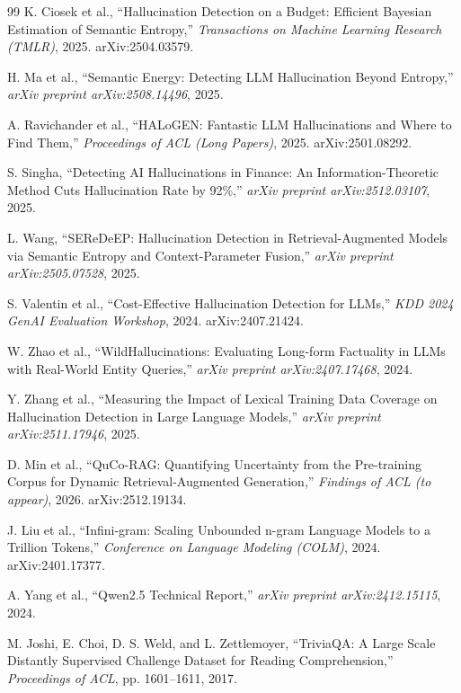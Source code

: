 \documentclass[oneside,ko,under]{snuthesis}
\begin{document}
\begin{thebibliography}{99}
K. Ciosek et al.,
``Hallucination Detection on a Budget: Efficient Bayesian Estimation of Semantic Entropy,''
\textit{Transactions on Machine Learning Research (TMLR)}, 2025. arXiv:2504.03579.

H. Ma et al.,
``Semantic Energy: Detecting LLM Hallucination Beyond Entropy,''
\textit{arXiv preprint arXiv:2508.14496}, 2025.

A. Ravichander et al.,
``HALoGEN: Fantastic LLM Hallucinations and Where to Find Them,''
\textit{Proceedings of ACL (Long Papers)}, 2025. arXiv:2501.08292.

S. Singha,
``Detecting AI Hallucinations in Finance: An Information-Theoretic Method Cuts Hallucination Rate by 92\%,''
\textit{arXiv preprint arXiv:2512.03107}, 2025.

L. Wang,
``SEReDeEP: Hallucination Detection in Retrieval-Augmented Models via Semantic Entropy and Context-Parameter Fusion,''
\textit{arXiv preprint arXiv:2505.07528}, 2025.

S. Valentin et al.,
``Cost-Effective Hallucination Detection for LLMs,''
\textit{KDD 2024 GenAI Evaluation Workshop}, 2024. arXiv:2407.21424.

W. Zhao et al.,
``\mbox{WildHallucinations}: Evaluating Long-form Factuality in LLMs with Real-World Entity Queries,''
\textit{arXiv preprint arXiv:2407.17468}, 2024.

Y. Zhang et al.,
``Measuring the Impact of Lexical Training Data Coverage on Hallucination Detection in Large Language Models,''
\textit{arXiv preprint arXiv:2511.17946}, 2025.

D. Min et al.,
``QuCo-RAG: Quantifying Uncertainty from the Pre-training Corpus for Dynamic Retrieval-Augmented Generation,''
\textit{Findings of ACL (to appear)}, 2026. arXiv:2512.19134.

J. Liu et al.,
``Infini-gram: Scaling Unbounded n-gram Language Models to a Trillion Tokens,''
\textit{Conference on Language Modeling (COLM)}, 2024. arXiv:2401.17377.

A. Yang et al.,
``Qwen2.5 Technical Report,''
\textit{arXiv preprint arXiv:2412.15115}, 2024.

M. Joshi, E. Choi, D. S. Weld, and L. Zettlemoyer,
``TriviaQA: A Large Scale Distantly Supervised Challenge Dataset for Reading Comprehension,''
\textit{Proceedings of ACL}, pp. 1601--1611, 2017.


\end{thebibliography}
\end{document}

